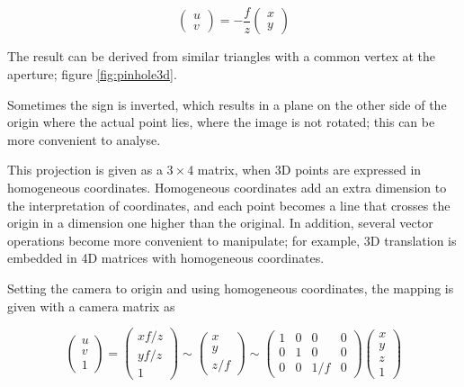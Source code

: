 \begin{equation}
\begin{pmatrix}
u \\ v
\end{pmatrix}
=
-\frac{f}{z} \begin{pmatrix}
x \\ y
\end{pmatrix}
\end{equation}

The result can be derived from similar triangles with a common vertex at the aperture; figure \ref{fig:pinhole3d}.

Sometimes the sign is inverted, which results in a plane on the other side of the origin where the actual point lies, where the image is not rotated; this can be more convenient to analyse.
\cite{hartley03multiview}



This projection is given as a $3 \times 4$ matrix, when 3D points are expressed in homogeneous coordinates.
Homogeneous coordinates add an extra dimension to the interpretation of coordinates, and each point becomes a line that crosses the origin in a dimension one higher than the original.
In addition, several vector operations become more convenient to manipulate; for example, 3D translation is embedded in 4D matrices with homogeneous coordinates. \cite{hartley03multiview,heyden2005multiple}

Setting the camera to origin and using homogeneous coordinates, the mapping is given with a camera matrix as

\begin{equation}
\begin{pmatrix}
u \\ v \\ 1
\end{pmatrix}
=
\begin{pmatrix}
xf/z \\ yf/z \\ 1
\end{pmatrix}
\sim
\begin{pmatrix}
x \\ y \\ z/f
\end{pmatrix}
\sim
\begin{pmatrix} \label{eq:cmat}
	1 & 0 & 0 & 0 \\
	0 & 1 & 0 & 0 \\
	0 & 0 & 1/f & 0
\end{pmatrix}
\begin{pmatrix}
x \\ y \\ z \\ 1
\end{pmatrix}
\end{equation}

